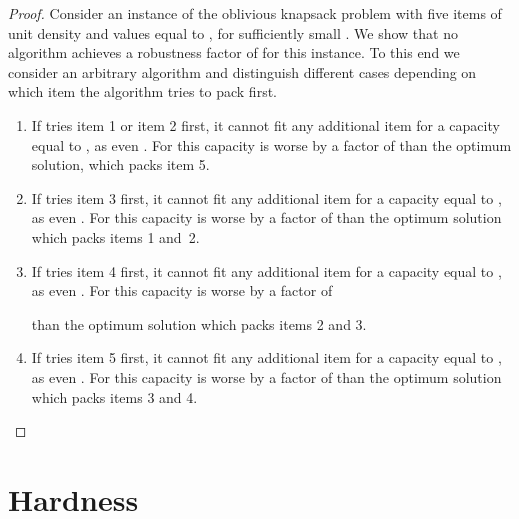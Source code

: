 \documentclass[11pt]{article}
\begin{document}
\begin{proof}
Consider an instance of the oblivious knapsack problem with five items
of unit density and values equal to
,
for sufficiently small . We show that no algorithm
achieves a robustness factor of  for this instance.
To this end we consider an arbitrary algorithm  and
distinguish different cases depending on which item the algorithm
tries to pack first. 
\renewcommand{\theenumi}{(\alph{enumi})}
\renewcommand{\labelenumi}{\theenumi}

\begin{enumerate}
\item If  tries item 1 or item 2 first, it cannot fit any
additional item for a capacity equal to , as even
. For this capacity  is worse
by a factor of  than the
optimum solution, which packs item 5. 

\item If  tries item 3 first, it cannot fit any additional
item for a capacity equal to , as even
. For this capacity  is
worse by a factor of  than
the optimum solution which packs items 1 and~2. 
\item If  tries item 4 first, it cannot fit any additional
item for a capacity equal to ,
as even .
For this capacity  is worse by a factor of

than the optimum solution which packs items 2 and 3. 
\item If  tries item 5 first, it cannot fit any additional
item for a capacity equal to , as even .
For this capacity  is worse by a factor of 
than the optimum solution which packs items 3 and 4.  
\end{enumerate}
\end{proof}


\section{Hardness\label{sec:Hardness}}
\end{document}
